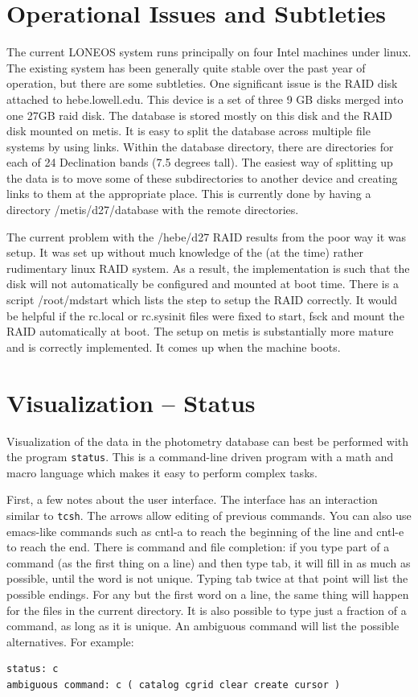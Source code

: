 \documentclass{article}
\begin{document}
\section{Operational Issues and Subtleties}

The current LONEOS system runs principally on four Intel machines
under linux.  The existing system has been generally quite stable over
the past year of operation, but there are some subtleties.  One
significant issue is the RAID disk attached to hebe.lowell.edu.  This
device is a set of three 9 GB disks merged into one 27GB raid disk.
The database is stored mostly on this disk and the RAID disk mounted
on metis.  It is easy to split the database across multiple file
systems by using links.  Within the database directory, there are
directories for each of 24 Declination bands (7.5 degrees tall).  The
easiest way of splitting up the data is to move some of these
subdirectories to another device and creating links to them at the
appropriate place.  This is currently done by having a directory
/metis/d27/database with the remote directories.  

The current problem with the /hebe/d27 RAID results from the poor way
it was setup.  It was set up without much knowledge of the (at the
time) rather rudimentary linux RAID system.  As a result, the
implementation is such that the disk will not automatically be
configured and mounted at boot time.  There is a script /root/mdstart
which lists the step to setup the RAID correctly.  It would be helpful
if the rc.local or rc.sysinit files were fixed to start, fsck and
mount the RAID automatically at boot.  The setup on metis is
substantially more mature and is correctly implemented.  It comes up
when the machine boots.

\section{Visualization -- Status}

Visualization of the data in the photometry database can best be
performed with the program {\tt status}.  This is a command-line
driven program with a math and macro language which makes it easy to
perform complex tasks.  

First, a few notes about the user interface.  The interface has an
interaction similar to {\tt tcsh}.  The arrows allow editing of
previous commands.  You can also use emacs-like commands such as
cntl-a to reach the beginning of the line and cntl-e to reach the end.
There is command and file completion: if you type part of a command
(as the first thing on a line) and then type tab, it will fill in as
much as possible, until the word is not unique.  Typing tab twice at
that point will list the possible endings.  For any but the first word
on a line, the same thing will happen for the files in the current
directory.  It is also possible to type just a fraction of a command,
as long as it is unique.  An ambiguous command will list the possible
alternatives.  For example:
\begin{verbatim}
status: c
ambiguous command: c ( catalog cgrid clear create cursor )
\end{verbatim}
\end{document}
